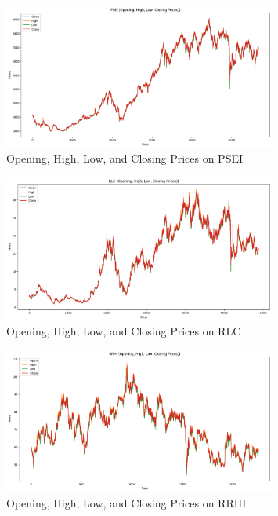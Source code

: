 \begin{figure}[ht]
    \centering
    \includegraphics[width=0.80\textwidth]{./assets/Appendices/B/OHLC_Prices/PSEI.png}
    \caption{Opening, High, Low, and Closing Prices on PSEI}
    \label{fig:ohlc_PSEI}
\end{figure}
\FloatBarrier

\begin{figure}[ht]
    \centering
    \includegraphics[width=0.80\textwidth]{./assets/Appendices/B/OHLC_Prices/RLC.png}
    \caption{Opening, High, Low, and Closing Prices on RLC}
    \label{fig:ohlc_RLC}
\end{figure}
\FloatBarrier

\begin{figure}[ht]
    \centering
    \includegraphics[width=0.80\textwidth]{./assets/Appendices/B/OHLC_Prices/RRHI.png}
    \caption{Opening, High, Low, and Closing Prices on RRHI}
    \label{fig:ohlc_RRHI}
\end{figure}
\FloatBarrier

